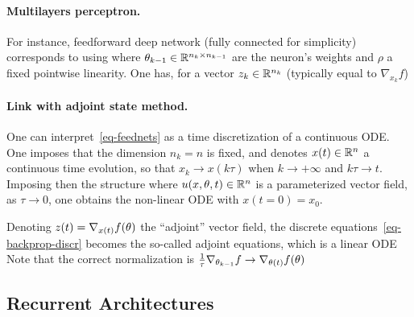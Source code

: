 \paragraph{Multilayers perceptron.}

For instance, feedforward deep network (fully connected for simplicity) corresponds to using 
where $\theta_{k-1} \in \mathbb{R}^{n_{k} \times n_{k-1}}$ are the neuron's weights and $\rho$ a fixed pointwise linearity.
%
One has, for a vector $z_k \in \mathbb{R}^{n_k}$ (typically equal to $\nabla_{x_{k}} f$)


\paragraph{Link with adjoint state method.}

One can interpret~\eqref{eq-feednets} as a time discretization of a continuous ODE. 
%
One imposes that the dimension $n_k=n$ is fixed, and denotes $x(t) \in \mathbb{R}^n$ a continuous time evolution, so that $x_{k} \rightarrow x(k \tau)$ when $k \rightarrow +\infty$ and $k \tau \rightarrow t$. 
%
Imposing then the structure
where $u(x,\theta,t) \in \mathbb{R}^n$ is a parameterized vector field, as $\tau \rightarrow 0$, one obtains the non-linear ODE
with $x(t=0)=x_0$.

Denoting $z(t) = \nabla_{x(t)} f(\theta)$ the ``adjoint'' vector field, the discrete equations~\eqref{eq-backprop-discr} becomes the so-called adjoint equations, which is a linear ODE 
Note that the correct normalization is $\frac{1}{\tau} \nabla_{\theta_{k-1}} f  \rightarrow \nabla_{\theta(t)} f(\theta)$

\subsection{Recurrent Architectures}

